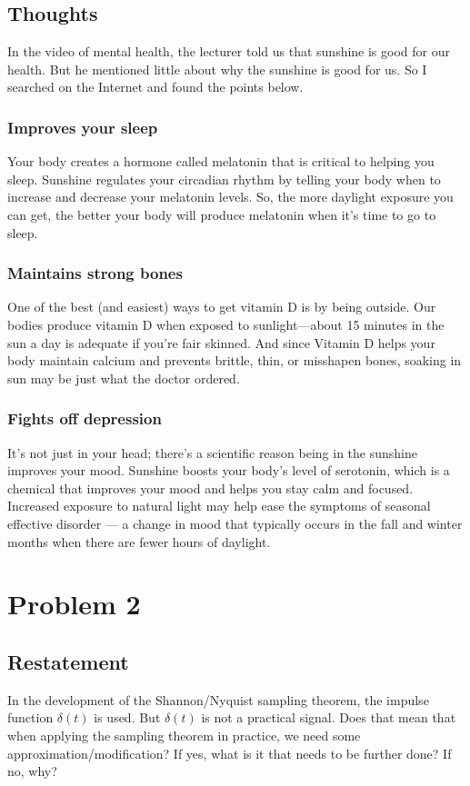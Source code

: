 \documentclass{article}
\begin{document}
\subsection{Thoughts}

In the video of mental health, the lecturer told us that sunshine is good for our health. But he mentioned little about
why the sunshine is good for us. So I searched on the Internet and found the points below.

\subsubsection*{Improves your sleep}

Your body creates a hormone called melatonin that is critical to helping you sleep. Sunshine regulates your circadian
rhythm by telling your body when to increase and decrease your melatonin levels. So, the more daylight exposure you can
get, the better your body will produce melatonin when it's time to go to sleep.

\subsubsection*{Maintains strong bones} One of the best (and easiest) ways to get vitamin D is by being outside. Our
 bodies produce vitamin D when exposed to sunlight—about 15 minutes in the sun a day is adequate if you're fair
 skinned. And since Vitamin D helps your body maintain calcium and prevents brittle, thin, or misshapen bones, soaking
 in sun may be just what the doctor ordered.

\subsubsection*{Fights off depression} It's not just in your head; there's a scientific reason being in the sunshine
 improves your mood. Sunshine boosts your body's level of serotonin, which is a chemical that improves your mood and
 helps you stay calm and focused. Increased exposure to natural light may help ease the symptoms of seasonal effective
 disorder --- a change in mood that typically occurs in the fall and winter months when there are fewer hours of
 daylight.


\section{Problem 2}

\subsection{Restatement} In the development of the Shannon/Nyquist sampling theorem, the impulse function $\delta(t)$ is
 used. But $\delta (t)$ is not a practical signal. Does that mean that when applying the sampling theorem in practice,
 we need some approximation/modification? If yes, what is it that needs to be further done? If no, why?
\end{document}
